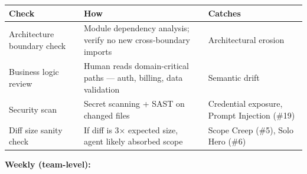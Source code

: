 \documentclass[
  a4paper,
  DIV=11,
  numbers=noendperiod]{scrreprt}
\newcounter{none} %
\begin{document}
{\def\LTcaptype{none} %
\begin{longtable}[]{@{}
  >{\raggedright\arraybackslash}p{}
  >{\raggedright\arraybackslash}p{}
  >{\raggedright\arraybackslash}p{}@{}}
\toprule\noalign{}
\begin{minipage}[b]{\linewidth}\raggedright
Check
\end{minipage} & \begin{minipage}[b]{\linewidth}\raggedright
How
\end{minipage} & \begin{minipage}[b]{\linewidth}\raggedright
Catches
\end{minipage} \\
\midrule\noalign{}
\endhead
\bottomrule\noalign{}
\endlastfoot
Architecture boundary check & Module dependency analysis; verify no new
cross-boundary imports & Architectural erosion \\
Business logic review & Human reads domain-critical paths --- auth,
billing, data validation & Semantic drift \\
Security scan & Secret scanning + SAST on changed files & Credential
exposure, Prompt Injection (\#19) \\
Diff size sanity check & If diff is 3× expected size, agent likely
absorbed scope & Scope Creep (\#5), Solo Hero (\#6) \\
\end{longtable}
}

\textbf{Weekly (team-level):}
\end{document}
